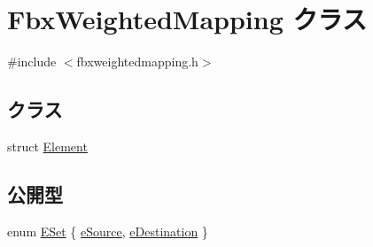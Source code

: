 \hypertarget{class_fbx_weighted_mapping}{}\section{Fbx\+Weighted\+Mapping クラス}
\label{class_fbx_weighted_mapping}


{\ttfamily \#include $<$fbxweightedmapping.\+h$>$}

\subsection*{クラス}
\begin{DoxyCompactItemize}
\item 
struct \hyperlink{struct_fbx_weighted_mapping_1_1_element}{Element}
\end{DoxyCompactItemize}
\subsection*{公開型}
\begin{DoxyCompactItemize}
\item 
enum \hyperlink{class_fbx_weighted_mapping_a3fb59c162b0c5b278f00e7bad4c578c6}{E\+Set} \{ \hyperlink{class_fbx_weighted_mapping_a3fb59c162b0c5b278f00e7bad4c578c6a9b018f20eabb78c563fc6ba8dfbc2e80}{e\+Source}, 
\hyperlink{class_fbx_weighted_mapping_a3fb59c162b0c5b278f00e7bad4c578c6a1ac5282e4d3bea4d16503bc5e0c021a8}{e\+Destination}
 \}
\end{DoxyCompactItemize}
